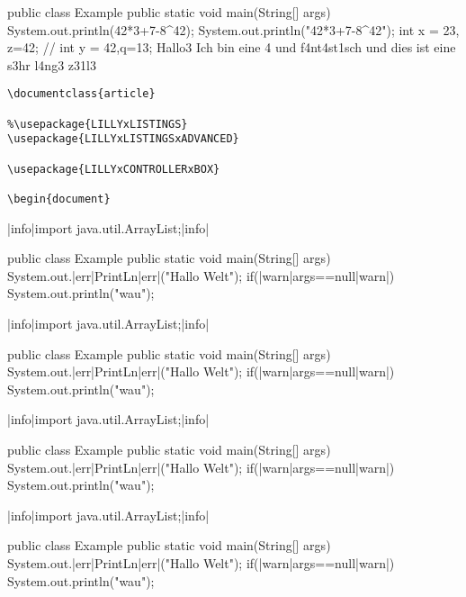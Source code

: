 \documentclass{article}
\begin{document}
\begin{java}
public class Example {
    public static void main(String[] args) {
        System.out.println(42*3+7-8^42);
        System.out.println("42*3+7-8^42");
        int x = 23, z=42;
        // int y = 42,q=13;
    }
    Hallo3 Ich bin eine 4 und f4nt4st1sch und dies ist eine s3hr l4ng3 z31l3
}
\end{java}


\Hallo
\begin{lstlisting}[language=lLatex]
\documentclass{article}

%\usepackage{LILLYxLISTINGS}
\usepackage{LILLYxLISTINGSxADVANCED}

\usepackage{LILLYxCONTROLLERxBOX}

\begin{document}
\end{lstlisting}

\begin{plainjava}
|info|import java.util.ArrayList;|info|

public class Example {
    public static void main(String[] args) {
        System.out.|err|PrintLn|err|("Hallo Welt");
        if(|warn|args==null|warn|)
            System.out.println("wau");
    }
}
\end{plainjava}

\begin{sjava}
    |info|import java.util.ArrayList;|info|

    public class Example {
        public static void main(String[] args) {
            System.out.|err|PrintLn|err|("Hallo Welt");
            if(|warn|args==null|warn|)
                System.out.println("wau");
        }
    }
\end{sjava}

\begin{java}[caption={Hi}]
|info|import java.util.ArrayList;|info|

public class Example {
    public static void main(String[] args) {
        System.out.|err|PrintLn|err|("Hallo Welt");
        if(|warn|args==null|warn|)
            System.out.println("wau");
    }
}
\end{java}
\begin{latex}
\begin{java}
|info|import java.util.ArrayList;|info|

public class Example {
    public static void main(String[] args) {
        System.out.|err|PrintLn|err|("Hallo Welt");
        if(|warn|args==null|warn|)
            System.out.println("wau");
    }
}
\end{java}
\end{latex}
\end{document}

